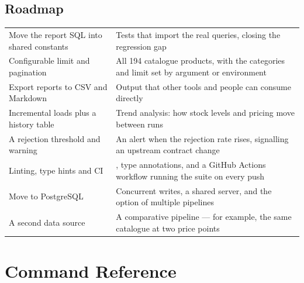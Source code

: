 \subsection{Roadmap}
\label{sec:roadmap}

\noindent
\begin{tabularx}{\textwidth}{@{}L{6.6cm}Y@{}}
 &  \\
\midrule
Move the report SQL into shared constants &
Tests that import the real queries, closing the regression gap \\
\addlinespace
Configurable limit and pagination &
All 194 catalogue products, with the categories and limit set by argument or environment \\
\addlinespace
Export reports to CSV and Markdown &
Output that other tools and people can consume directly \\
\addlinespace
Incremental loads plus a history table &
Trend analysis: how stock levels and pricing move between runs \\
\addlinespace
A rejection threshold and warning &
An alert when the rejection rate rises, signalling an upstream contract change \\
\addlinespace
Linting, type hints and CI &
, type annotations, and a GitHub Actions workflow running the
suite on every push \\
\addlinespace
Move to PostgreSQL &
Concurrent writes, a shared server, and the option of multiple pipelines \\
\addlinespace
A second data source &
A comparative pipeline --- for example, the same catalogue at two
price points \\
\end{tabularx}

\appendix

\section{Command Reference}

